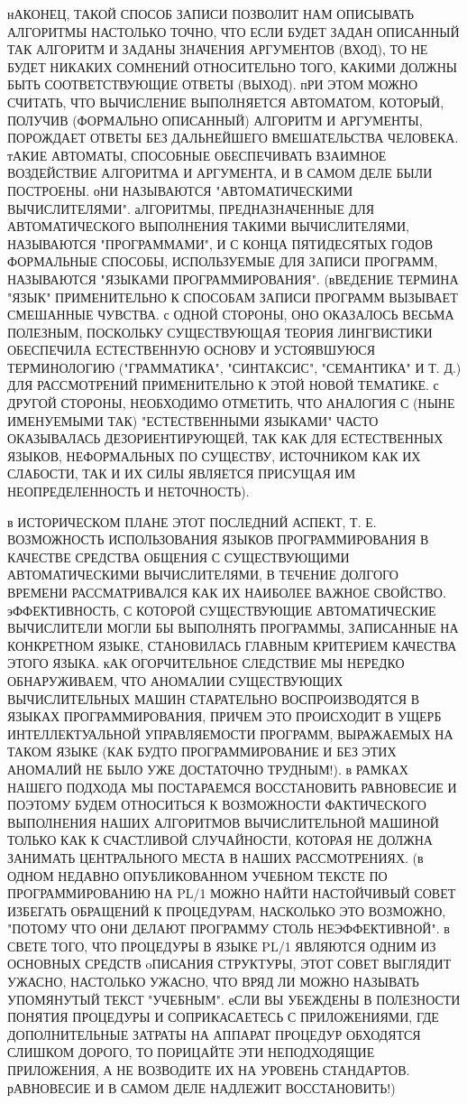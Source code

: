 нАКОНЕЦ, ТАКОЙ СПОСОБ ЗАПИСИ ПОЗВОЛИТ НАМ ОПИСЫВАТЬ
АЛГОРИТМЫ НАСТОЛЬКО ТОЧНО, ЧТО ЕСЛИ БУДЕТ ЗАДАН
ОПИСАННЫЙ ТАК АЛГОРИТМ И ЗАДАНЫ ЗНАЧЕНИЯ АРГУМЕНТОВ
(ВХОД), ТО НЕ БУДЕТ НИКАКИХ СОМНЕНИЙ ОТНОСИТЕЛЬНО
ТОГО, КАКИМИ ДОЛЖНЫ БЫТЬ СООТВЕТСТВУЮЩИЕ ОТВЕТЫ
(ВЫХОД). пРИ ЭТОМ МОЖНО СЧИТАТЬ, ЧТО ВЫЧИСЛЕНИЕ
ВЫПОЛНЯЕТСЯ АВТОМАТОМ, КОТОРЫЙ, ПОЛУЧИВ (ФОРМАЛЬНО
ОПИСАННЫЙ) АЛГОРИТМ И АРГУМЕНТЫ, ПОРОЖДАЕТ ОТВЕТЫ
БЕЗ ДАЛЬНЕЙШЕГО ВМЕШАТЕЛЬСТВА ЧЕЛОВЕКА. тАКИЕ
АВТОМАТЫ, СПОСОБНЫЕ ОБЕСПЕЧИВАТЬ ВЗАИМНОЕ
ВОЗДЕЙСТВИЕ АЛГОРИТМА И АРГУМЕНТА, И В САМОМ ДЕЛЕ
БЫЛИ ПОСТРОЕНЫ. оНИ НАЗЫВАЮТСЯ "АВТОМАТИЧЕСКИМИ
ВЫЧИСЛИТЕЛЯМИ". аЛГОРИТМЫ, ПРЕДНАЗНАЧЕННЫЕ ДЛЯ
АВТОМАТИЧЕСКОГО ВЫПОЛНЕНИЯ ТАКИМИ ВЫЧИСЛИТЕЛЯМИ,
НАЗЫВАЮТСЯ "ПРОГРАММАМИ", И С КОНЦА ПЯТИДЕСЯТЫХ
ГОДОВ ФОРМАЛЬНЫЕ СПОСОБЫ, ИСПОЛЬЗУЕМЫЕ ДЛЯ ЗАПИСИ
ПРОГРАММ, НАЗЫВАЮТСЯ "ЯЗЫКАМИ ПРОГРАММИРОВАНИЯ".
(вВЕДЕНИЕ ТЕРМИНА "ЯЗЫК" ПРИМЕНИТЕЛЬНО К СПОСОБАМ
ЗАПИСИ ПРОГРАММ ВЫЗЫВАЕТ СМЕШАННЫЕ ЧУВСТВА. с ОДНОЙ
СТОРОНЫ, ОНО ОКАЗАЛОСЬ ВЕСЬМА ПОЛЕЗНЫМ, ПОСКОЛЬКУ
СУЩЕСТВУЮЩАЯ ТЕОРИЯ ЛИНГВИСТИКИ ОБЕСПЕЧИЛА
ЕСТЕСТВЕННУЮ ОСНОВУ И УСТОЯВШУЮСЯ ТЕРМИНОЛОГИЮ
("ГРАММАТИКА", "СИНТАКСИС", "СЕМАНТИКА" И Т. Д.)
ДЛЯ РАССМОТРЕНИЙ ПРИМЕНИТЕЛЬНО К ЭТОЙ НОВОЙ
ТЕМАТИКЕ. с ДРУГОЙ СТОРОНЫ, НЕОБХОДИМО ОТМЕТИТЬ,
ЧТО АНАЛОГИЯ С (НЫНЕ ИМЕНУЕМЫМИ ТАК) "ЕСТЕСТВЕННЫМИ
ЯЗЫКАМИ" ЧАСТО ОКАЗЫВАЛАСЬ ДЕЗОРИЕНТИРУЮЩЕЙ, ТАК
КАК ДЛЯ ЕСТЕСТВЕННЫХ ЯЗЫКОВ, НЕФОРМАЛЬНЫХ ПО
СУЩЕСТВУ, ИСТОЧНИКОМ КАК ИХ СЛАБОСТИ, ТАК И ИХ СИЛЫ
ЯВЛЯЕТСЯ ПРИСУЩАЯ ИМ НЕОПРЕДЕЛЕННОСТЬ И
НЕТОЧНОСТЬ).

 в ИСТОРИЧЕСКОМ ПЛАНЕ ЭТОТ ПОСЛЕДНИЙ АСПЕКТ, Т. Е.
ВОЗМОЖНОСТЬ ИСПОЛЬЗОВАНИЯ ЯЗЫКОВ ПРОГРАММИРОВАНИЯ В
КАЧЕСТВЕ СРЕДСТВА ОБЩЕНИЯ С СУЩЕСТВУЮЩИМИ
АВТОМАТИЧЕСКИМИ ВЫЧИСЛИТЕЛЯМИ, В ТЕЧЕНИЕ ДОЛГОГО
ВРЕМЕНИ РАССМАТРИВАЛСЯ КАК ИХ НАИБОЛЕЕ ВАЖНОЕ
СВОЙСТВО. эФФЕКТИВНОСТЬ, С КОТОРОЙ СУЩЕСТВУЮЩИЕ
АВТОМАТИЧЕСКИЕ ВЫЧИСЛИТЕЛИ МОГЛИ БЫ ВЫПОЛНЯТЬ
ПРОГРАММЫ, ЗАПИСАННЫЕ НА КОНКРЕТНОМ ЯЗЫКЕ,
СТАНОВИЛАСЬ ГЛАВНЫМ КРИТЕРИЕМ КАЧЕСТВА ЭТОГО ЯЗЫКА.
кАК ОГОРЧИТЕЛЬНОЕ СЛЕДСТВИЕ МЫ НЕРЕДКО
ОБНАРУЖИВАЕМ, ЧТО АНОМАЛИИ СУЩЕСТВУЮЩИХ
ВЫЧИСЛИТЕЛЬНЫХ МАШИН СТАРАТЕЛЬНО ВОСПРОИЗВОДЯТСЯ В
ЯЗЫКАХ ПРОГРАММИРОВАНИЯ, ПРИЧЕМ ЭТО ПРОИСХОДИТ В
УЩЕРБ ИНТЕЛЛЕКТУАЛЬНОЙ УПРАВЛЯЕМОСТИ ПРОГРАММ,
ВЫРАЖАЕМЫХ НА ТАКОМ ЯЗЫКЕ (КАК БУДТО
ПРОГРАММИРОВАНИЕ И БЕЗ ЭТИХ АНОМАЛИЙ НЕ БЫЛО УЖЕ
ДОСТАТОЧНО ТРУДНЫМ!). в РАМКАХ НАШЕГО ПОДХОДА МЫ
ПОСТАРАЕМСЯ ВОССТАНОВИТЬ РАВНОВЕСИЕ И ПОЭТОМУ БУДЕМ
ОТНОСИТЬСЯ К ВОЗМОЖНОСТИ ФАКТИЧЕСКОГО ВЫПОЛНЕНИЯ
НАШИХ АЛГОРИТМОВ ВЫЧИСЛИТЕЛЬНОЙ МАШИНОЙ ТОЛЬКО КАК
К СЧАСТЛИВОЙ СЛУЧАЙНОСТИ, КОТОРАЯ НЕ ДОЛЖНА
ЗАНИМАТЬ ЦЕНТРАЛЬНОГО МЕСТА В НАШИХ РАССМОТРЕНИЯХ.
(в ОДНОМ НЕДАВНО ОПУБЛИКОВАННОМ УЧЕБНОМ ТЕКСТЕ ПО
ПРОГРАММИРОВАНИЮ НА PL/1 МОЖНО НАЙТИ НАСТОЙЧИВЫЙ
СОВЕТ ИЗБЕГАТЬ ОБРАЩЕНИЙ К ПРОЦЕДУРАМ, НАСКОЛЬКО
ЭТО ВОЗМОЖНО, "ПОТОМУ ЧТО ОНИ ДЕЛАЮТ ПРОГРАММУ
СТОЛЬ НЕЭФФЕКТИВНОЙ". в СВЕТЕ ТОГО, ЧТО ПРОЦЕДУРЫ В
ЯЗЫКЕ PL/1 ЯВЛЯЮТСЯ ОДНИМ ИЗ ОСНОВНЫХ СРЕДСТВ
oПИСАНИЯ СТРУКТУРЫ, ЭТОТ СОВЕТ ВЫГЛЯДИТ УЖАСНО,
НАСТОЛЬКО УЖАСНО, ЧТО ВРЯД ЛИ МОЖНО НАЗЫВАТЬ
УПОМЯНУТЫЙ ТЕКСТ "УЧЕБНЫМ". еСЛИ  ВЫ УБЕЖДЕНЫ В
ПОЛЕЗНОСТИ ПОНЯТИЯ ПРОЦЕДУРЫ И СОПРИКАСАЕТЕСЬ С
ПРИЛОЖЕНИЯМИ, ГДЕ ДОПОЛНИТЕЛЬНЫЕ ЗАТРАТЫ НА АППАРАТ
ПРОЦЕДУР ОБХОДЯТСЯ СЛИШКОМ ДОРОГО, ТО ПОРИЦАЙТЕ ЭТИ
НЕПОДХОДЯЩИЕ ПРИЛОЖЕНИЯ, А НЕ ВОЗВОДИТЕ ИХ НА
УРОВЕНЬ СТАНДАРТОВ. рАВНОВЕСИЕ И В САМОМ ДЕЛЕ
НАДЛЕЖИТ ВОССТАНОВИТЬ!)

